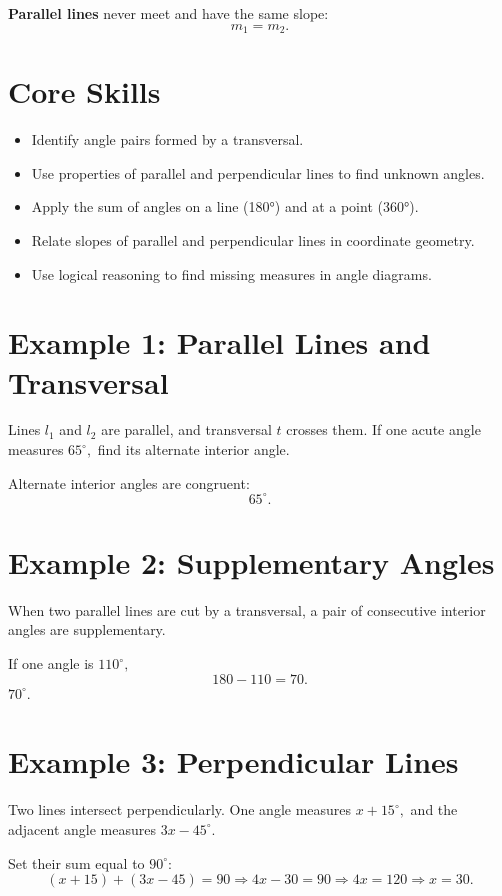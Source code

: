 \documentclass[14pt]{extarticle}
\begin{document}
\textbf{Parallel lines} never meet and have the same slope:  
\[
m_1 = m_2.
\]

\section*{Core Skills}
\begin{itemize}
  \item Identify angle pairs formed by a transversal.
  \item Use properties of parallel and perpendicular lines to find unknown angles.
  \item Apply the sum of angles on a line (180°) and at a point (360°).
  \item Relate slopes of parallel and perpendicular lines in coordinate geometry.
  \item Use logical reasoning to find missing measures in angle diagrams.
\end{itemize}

\section*{Example 1: Parallel Lines and Transversal}

Lines \(l_1\) and \(l_2\) are parallel, and transversal \(t\) crosses them.  
If one acute angle measures \(65^\circ,\) find its alternate interior angle.

Alternate interior angles are congruent:
\[
\boxed{65^\circ.}
\]

\section*{Example 2: Supplementary Angles}

When two parallel lines are cut by a transversal, a pair of consecutive interior angles are supplementary.

If one angle is \(110^\circ,\)
\[
180 - 110 = 70.
\]
\(\boxed{70^\circ.}\)

\section*{Example 3: Perpendicular Lines}

Two lines intersect perpendicularly. One angle measures \(x + 15^\circ,\) and the adjacent angle measures \(3x - 45^\circ.\)

Set their sum equal to \(90^\circ:\)
\[
(x + 15) + (3x - 45) = 90 \Rightarrow 4x - 30 = 90 \Rightarrow 4x = 120 \Rightarrow x = 30.
\]
\end{document}
